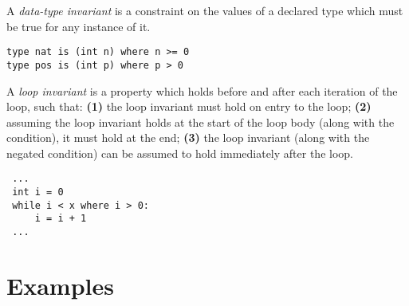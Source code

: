 \documentclass[a4paper,10pt,twcolumn]{article}
\begin{document}
A {\em data-type invariant} is a constraint on the values of a
declared type which must be true for any instance of it.

\begin{lstlisting}
type nat is (int n) where n >= 0
type pos is (int p) where p > 0
\end{lstlisting}

A {\em loop invariant} is a property which holds before and after each
iteration of the loop, such that: {\bf (1)} the loop invariant must hold on
entry to the loop; {\bf (2)} assuming the loop invariant holds at the start of
the loop body (along with the condition), it must hold at the end; {\bf (3)}
the loop invariant (along with the negated condition) can be assumed
to hold immediately after the loop.
\begin{lstlisting}
 ...
 int i = 0
 while i < x where i > 0:
     i = i + 1 
 ...
\end{lstlisting}


\section*{Examples}
\end{document}

